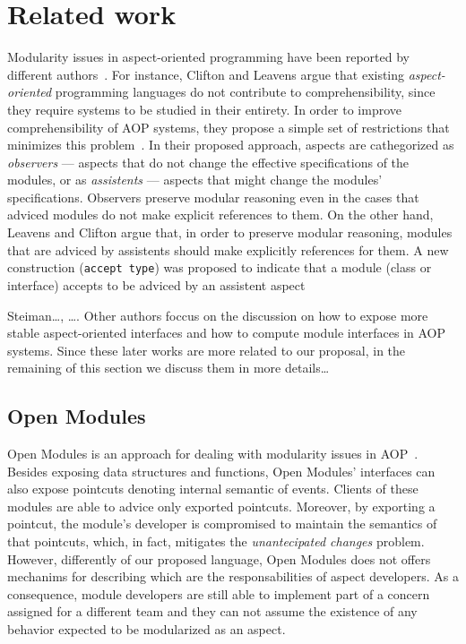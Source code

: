 \section[draft]{Related work}

Modularity issues in aspect-oriented programming have been reported by
different authors~\cite{sullivan-sigsoft-2005, leavens-observers-2002,
steiman-sigplan-2006}. For instance, Clifton and Leavens argue that
existing \emph{aspect-oriented} programming languages do not contribute to
comprehensibility, since they require systems to be studied in their entirety.
In order to improve comprehensibility of AOP systems, they propose a simple set
of restrictions that minimizes this problem~\cite{leavens-observers-2002}. In
their proposed approach, aspects are cathegorized as \emph{observers} ---
aspects that do not change the effective specifications of the modules, or as
\emph{assistents} --- aspects that might change the modules' specifications.
Observers preserve modular reasoning even in the cases that adviced modules do
not make explicit references to them. On the other hand, Leavens and Clifton
argue that, in order to preserve modular reasoning, modules that are adviced by
assistents should make explicitly references for them. A new construction
(\texttt{accept type}) was proposed to indicate that a module (class or
interface) accepts to be adviced by an assistent aspect


Steiman\ldots, \ldots . Other authors foccus on the discussion on how to expose
more stable aspect-oriented interfaces and how to compute module interfaces in
AOP systems. Since these later works are more related to our proposal, in the
remaining of this section we discuss them in more details\ldots


\subsection{Open Modules}

Open Modules is an approach for dealing with modularity issues in 
AOP~\cite{aldrich-ecoop-05}. Besides exposing data structures and 
functions, Open Modules' interfaces can also expose pointcuts denoting 
internal semantic of events. Clients of these modules are able to advice 
only exported pointcuts. Moreover, by exporting a pointcut, the module's 
developer is compromised to maintain the semantics of that pointcuts, 
which, in fact, mitigates the \emph{unantecipated changes} problem.
However, differently of our proposed language, Open Modules does not offers
mechanims for describing which are the responsabilities of aspect developers. As
a consequence, module developers are still able to implement part of a concern
assigned for a different team and they can not assume the existence of any
behavior expected to be modularized as an aspect.
 

